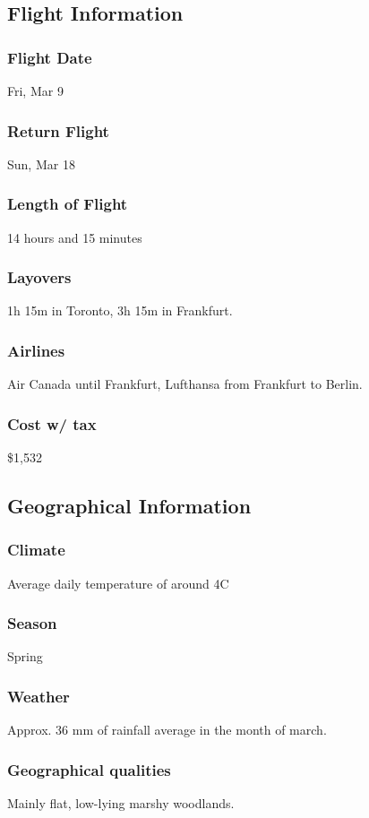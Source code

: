 \documentclass[11pt]{article}
\begin{document}
\subsection*{Flight Information}
\label{sec:org2fd911b}
\subsubsection*{Flight Date}
\label{sec:orgf600ce7}
Fri, Mar 9
\subsubsection*{Return Flight}
\label{sec:orgc85292b}
Sun, Mar 18
\subsubsection*{Length of Flight}
\label{sec:org6e497d0}
14 hours and 15 minutes
\subsubsection*{Layovers}
\label{sec:org67665b0}
1h 15m in Toronto, 3h 15m in Frankfurt.
\subsubsection*{Airlines}
\label{sec:org2194c45}
Air Canada until Frankfurt, Lufthansa from Frankfurt to Berlin.
\subsubsection*{Cost w/ tax}
\label{sec:org95532de}
\$1,532
\subsection*{Geographical Information}
\label{sec:org3085a5e}
\subsubsection*{Climate}
\label{sec:org28af42c}
Average daily temperature of around 4C
\subsubsection*{Season}
\label{sec:org1080a24}
Spring
\subsubsection*{Weather}
\label{sec:orgc85a07d}
Approx. 36 mm of rainfall average in the month of march.
\subsubsection*{Geographical qualities}
\label{sec:org2613e2a}
Mainly flat, low-lying marshy woodlands. 
\end{document}
